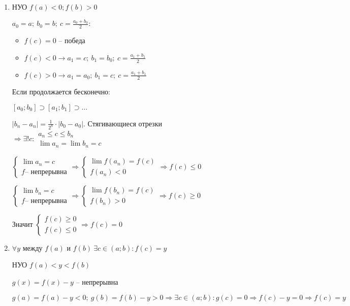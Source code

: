 \documentclass[14pt, letter paper]{article}
\begin{document}
\begin{enumerate}
    \item НУО $f(a) < 0; f(b) > 0$

    $a_0 = a;\ b_0 = b;\ c = \frac{a_0 + b_0}{2}:$

    \begin{itemize}
        \item $f(c) = 0$ -- победа
        \item $f(c) < 0 \rightarrow a_1 = c;\ b_1 = b_0;\ c = \frac{a_1 + b_1}{2}$
        \item $f(c) > 0 \rightarrow a_1 = a_0;\ b_1 = c;\ c = \frac{a_1 + b_1}{2}$
    \end{itemize}

    Если продолжается бесконечно:

    $[a_0;b_0] \supset [a_1;b_1] \supset \ldots$

    $|b_n - a_n| = \frac{1}{2^n} \cdot |b_0 - a_0|$. Стягивающиеся отрезки $\Rightarrow \exists!c : \begin{gathered}
        a_n \leq c \leq b_n \\
        \lim{a_n} = \lim{b_n} = c
    \end{gathered}$

    $\begin{cases}
        \lim{a_n} = c \\
        f \text{-- непрерывна}
    \end{cases} \Rightarrow \begin{cases}
        \lim{f(a_n)} = f(c) \\
        f(a_n) < 0
    \end{cases} \Rightarrow f(c) \leq 0$

    $\begin{cases}
        \lim{b_n} = c \\
        f \text{-- непрерывна}
    \end{cases} \Rightarrow \begin{cases}
        \lim{f(b_n)} = f(c) \\
        f(b_n) > 0
    \end{cases} \Rightarrow f(c) \geq 0$

    Значит $\begin{cases}
        f(c) \geq 0 \\
        f(c) \leq 0
    \end{cases} \Rightarrow f(c) = 0$

    \item $\forall y$ между $f(a)$ и $f(b)\ \exists c \in (a; b) : f(c) = y$

    НУО $f(a) < y < f(b)$

    $g(x) = f(x) - y$ -- непрерывна

    $g(a) = f(a) - y < 0;\ g(b) = f(b) - y > 0 \Rightarrow \exists c \in (a; b) : g(c) = 0 \Rightarrow f(c) - y = 0 \Rightarrow f(c) = y$
\end{enumerate}
\end{document}
